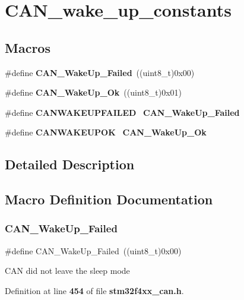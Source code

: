 \section{C\+A\+N\+\_\+wake\+\_\+up\+\_\+constants}
\label{group__CAN__wake__up__constants}
\subsection*{Macros}
\begin{DoxyCompactItemize}
\item 
\#define \textbf{ C\+A\+N\+\_\+\+Wake\+Up\+\_\+\+Failed}~((uint8\+\_\+t)0x00)
\item 
\#define \textbf{ C\+A\+N\+\_\+\+Wake\+Up\+\_\+\+Ok}~((uint8\+\_\+t)0x01)
\item 
\#define \textbf{ C\+A\+N\+W\+A\+K\+E\+U\+P\+F\+A\+I\+L\+ED}~\textbf{ C\+A\+N\+\_\+\+Wake\+Up\+\_\+\+Failed}
\item 
\#define \textbf{ C\+A\+N\+W\+A\+K\+E\+U\+P\+OK}~\textbf{ C\+A\+N\+\_\+\+Wake\+Up\+\_\+\+Ok}
\end{DoxyCompactItemize}


\subsection{Detailed Description}


\subsection{Macro Definition Documentation}
\mbox{\label{group__CAN__wake__up__constants_ga837fd7ad47fee78e43a186544e2b390b}} 
\subsubsection{C\+A\+N\+\_\+\+Wake\+Up\+\_\+\+Failed}
{\footnotesize\ttfamily \#define C\+A\+N\+\_\+\+Wake\+Up\+\_\+\+Failed~((uint8\+\_\+t)0x00)}

C\+AN did not leave the sleep mode 

Definition at line \textbf{ 454} of file \textbf{ stm32f4xx\+\_\+can.\+h}.

